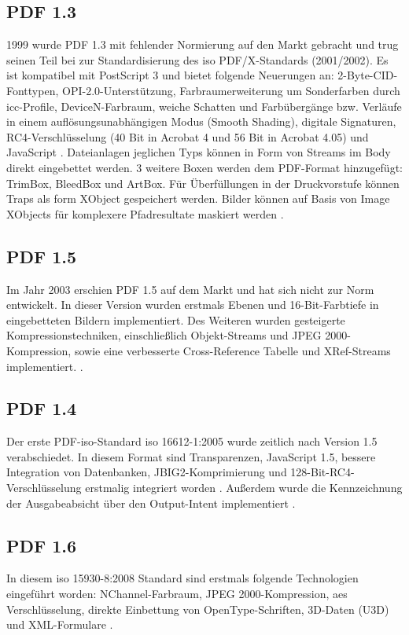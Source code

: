 \subsection{PDF 1.3}
1999 wurde PDF 1.3 mit fehlender Normierung auf den Markt gebracht und trug seinen Teil bei zur Standardisierung des \gls{iso} PDF/X-Standards (2001/2002). Es ist kompatibel mit PostScript 3 und bietet folgende Neuerungen an: 2-Byte-CID-Fonttypen, OPI-2.0-Unterstützung, Farbraumerweiterung um Sonderfarben durch \gls{icc}-Profile, DeviceN-Farbraum, weiche Schatten und Farbübergänge bzw. Verläufe in einem auflösungsunabhängigen Modus (Smooth Shading), digitale Signaturen, RC4-Verschlüsselung (40 Bit in Acrobat 4 und 56 Bit in Acrobat 4.05) und JavaScript \cite{proj-consult, schneeberger}. Dateianlagen jeglichen Typs können in Form von Streams im Body direkt eingebettet werden. 3 weitere Boxen werden dem PDF-Format hinzugefügt: TrimBox, BleedBox und ArtBox. Für Überfüllungen in der Druckvorstufe können Traps als form XObject gespeichert werden. Bilder können auf Basis von Image XObjects für komplexere Pfadresultate maskiert werden \cite{schneeberger}.

\subsection{PDF 1.5}
Im Jahr 2003 erschien PDF 1.5 auf dem Markt und hat sich nicht zur Norm entwickelt. In dieser Version wurden erstmals Ebenen und 16-Bit-Farbtiefe in eingebetteten Bildern implementiert. Des Weiteren wurden gesteigerte Kompressionstechniken, einschließlich Objekt-Streams und JPEG 2000-Kompression, sowie eine verbesserte Cross-Reference Tabelle und XRef-Streams implementiert. \cite{proj-consult, schneeberger}. 

\subsection{PDF 1.4}
Der erste PDF-\gls{iso}-Standard \gls{iso} 16612-1:2005 wurde zeitlich nach Version 1.5 verabschiedet. In diesem Format sind Transparenzen, JavaScript 1.5, bessere Integration von Datenbanken, JBIG2-Komprimierung und 128-Bit-RC4-Verschlüsselung erstmalig integriert worden \cite{proj-consult}. Außerdem wurde die Kennzeichnung der Ausgabeabsicht über den Output-Intent implementiert \cite{schneeberger}.

\subsection{PDF 1.6}
In diesem \gls{iso} 15930-8:2008 Standard sind erstmals folgende Technologien eingeführt worden: NChannel-Farbraum, JPEG 2000-Kompression, \gls{aes} Verschlüsselung, direkte Einbettung von OpenType-Schriften, 3D-Daten (U3D) und XML-Formulare \cite{proj-consult}.

